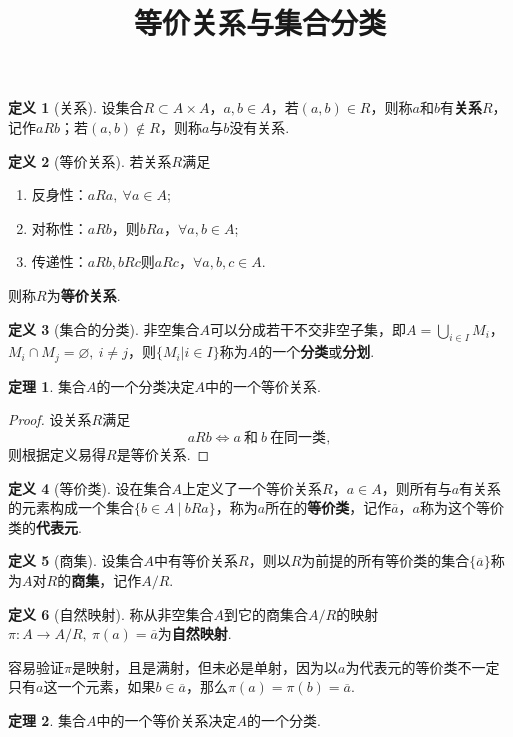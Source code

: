 \documentclass[12pt]{ctexart}
\title{\vspace{-2em}\textbf{等价关系与集合分类}\vspace{-2em}}
\date{ }
\theoremstyle{definition}
\newtheorem{definition}{定义}
\newtheorem{theorem}{定理}
\theoremstyle{plain}
\begin{document}
	\maketitle
	\begin{definition}[关系]
		设集合$R\subset A\times A$，$a,b\in A$，若$(a,b)\in R$，则称$a$和$b$有\textbf{关系}$R$，记作$aRb$；若$(a,b)\notin R$，则称$a$与$b$没有关系.
	\end{definition}
	\begin{definition}[等价关系]
		若关系$R$满足
		\begin{enumerate}
			\item 反身性：$aRa,\ \forall a\in A$;
			\item 对称性：$aRb$，则$bRa$，$\forall a,b\in A$;
			\item 传递性：$aRb,bRc$则$aRc$，$\forall a,b,c\in A$.
		\end{enumerate}
		则称$R$为\textbf{等价关系}.
	\end{definition}
	\begin{definition}[集合的分类]
		非空集合$A$可以分成若干不交非空子集，即$A=\bigcup_{i\in I}M_i$，$M_i\cap M_j=\varnothing,\ i\neq j$，则$\{M_i|i\in I\}$称为$A$的一个\textbf{分类}或\textbf{分划}.
	\end{definition}
	\begin{theorem}
		集合$A$的一个分类决定$A$中的一个等价关系.
	\end{theorem}
	\begin{proof}
		设关系$R$满足
		$$aRb\iff a\ \text{和}\ b\ \text{在同一类},$$
		则根据定义易得$R$是等价关系.
	\end{proof}
	\begin{definition}[等价类]
		设在集合$A$上定义了一个等价关系$R$，$a\in A$，则所有与$a$有关系的元素构成一个集合$\{b\in A\ |\ bRa\}$，称为$a$所在的\textbf{等价类}，记作$\overline{a}$，$a$称为这个等价类的\textbf{代表元}.
	\end{definition}
	\begin{definition}[商集]
		设集合$A$中有等价关系$R$，则以$R$为前提的所有等价类的集合$\{\overline{a}\}$称为$A$对$R$的\textbf{商集}，记作$A/R$.
	\end{definition}
	\begin{definition}[自然映射]
		称从非空集合$A$到它的商集合$A/R$的映射$\pi:A\to A/R,\ \pi(a)=\overline{a}$为\textbf{自然映射}.
	\end{definition}
	容易验证$\pi$是映射，且是满射，但未必是单射，因为以$a$为代表元的等价类不一定只有$a$这一个元素，如果$b\in\overline{a}$，那么$\pi(a)=\pi(b)=\overline{a}$.
	\begin{theorem}
		集合$A$中的一个等价关系决定$A$的一个分类.
	\end{theorem}
\end{document}

